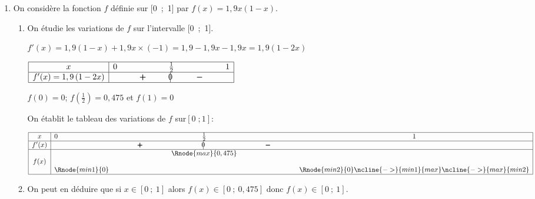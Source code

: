 \documentclass[10pt]{article}
\begin{document}
\begin{enumerate}
\item On considère la fonction $f$ définie sur [0~;~1] par $f(x) = 1,9x(1 - x)$.
	\begin{enumerate}
		\item On étudie les variations de $f$ sur l'intervalle [0~;~1].
		
$f'(x)=1,9 \left (1-x\right ) + 1,9x\times(-1) = 1,9 - 1,9x -1,9x = 1,9\left (1-2x\right )$		
		
\begin{center}
\renewcommand{\arraystretch}{1.4}
\def\esp{\hspace*{1.5cm}}
$\begin{array}{|c | *{5}{c} |} 
\hline
x  & 0 & \esp & \frac{1}{2} & \esp  & 1 \\
\hline
f'(x) =1,9\left (1-2x\right )&  & \pmb{+} &  \vline\hspace{-2.7pt}{0} & \pmb{-} &\\
\hline
\end{array}$
\renewcommand{\arraystretch}{1}
\end{center}	

$f(0)=0$; $f\left (\frac{1}{2}\right) = 0,475$ et $f(1)=0$

On établit le tableau des variations de $f$ sur$[0\;; 1]$:

\begin{center}
{\renewcommand{\arraystretch}{1.3}
\def\esp{\hspace*{2.5cm}}
\def\hauteur{0pt}
$\begin{array}{|c|l*4{c}|}
\hline
x & 0  & \esp & \frac{1}{2} & \esp & 1 \\ 
\hline
f'(x) &  & \pmb{+} & \vline\hspace{-2.7pt}0 & \pmb{-} & \\ 
\hline
 & & & \Rnode{max}{0,475}  & & \\
f(x) &  & &  & & \rule{0pt}{\hauteur} \\ 
 &  \Rnode{min1}{0} &   &  &  &   \Rnode{min2}{0} \rule{0pt}{\hauteur}
 \ncline{->}{min1}{max} \ncline{->}{max}{min2} 
 \\
\hline
\end{array} $
}
\end{center}		
		
		\item On peut en déduire que si $x \in [0~;~1]$ alors $f(x) \in [0~;~0,475]$ donc $f(x) \in [0~;~1]$.
	\end{enumerate}	


\end{enumerate}
\end{document}
